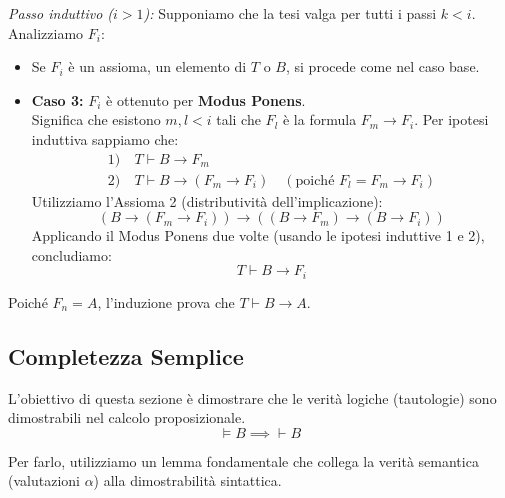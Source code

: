 \documentclass[a4paper,11pt]{report}
\begin{document}
\begin{proofframe}[title=dim]
    \textit{Passo induttivo (\(i > 1\)):}
    Supponiamo che la tesi valga per tutti i passi \( k < i \). Analizziamo \( F_i \):
    \begin{itemize}
        \item Se \( F_i \) è un assioma, un elemento di \( T \) o \( B \), si procede come nel caso base.
        \item \textbf{Caso 3:} \( F_i \) è ottenuto per \textbf{Modus Ponens}. \\
        Significa che esistono \( m, l < i \) tali che \( F_l \) è la formula \( F_m \to F_i \).
        Per ipotesi induttiva sappiamo che:
        \begin{align*}
            1) \ & T \vdash B \to F_m \\
            2) \ & T \vdash B \to (F_m \to F_i) \quad (\text{poiché } F_l = F_m \to F_i)
        \end{align*}
        Utilizziamo l'Assioma 2 (distributività dell'implicazione):
        \[ (B \to (F_m \to F_i)) \to ((B \to F_m) \to (B \to F_i)) \]
        Applicando il Modus Ponens due volte (usando le ipotesi induttive 1 e 2), concludiamo:
        \[ T \vdash B \to F_i \]
    \end{itemize}
    Poiché \( F_n = A \), l'induzione prova che \( T \vdash B \to A \).
\end{proofframe}




\subsection{Completezza Semplice}

L'obiettivo di questa sezione è dimostrare che le verità logiche (tautologie) sono dimostrabili nel calcolo proposizionale.
\[ \vDash B \implies \vdash B \]

Per farlo, utilizziamo un lemma fondamentale che collega la verità semantica (valutazioni $\alpha$) alla dimostrabilità sintattica.
\end{document}
